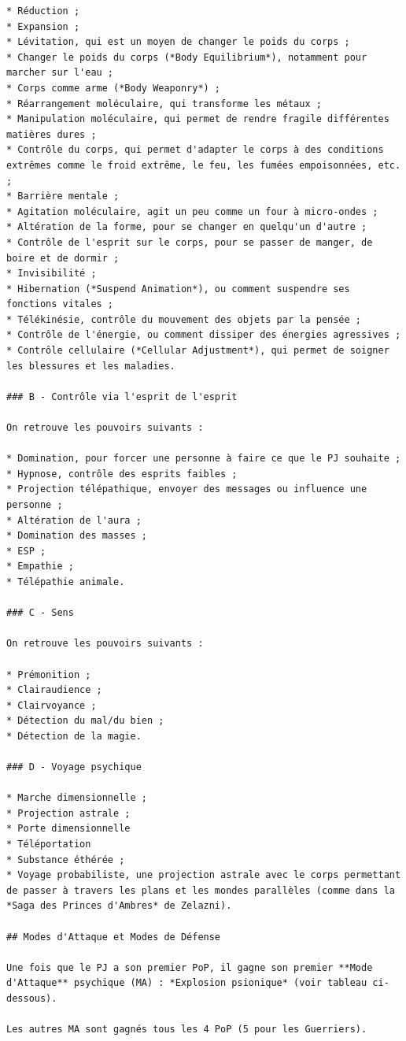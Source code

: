\documentclass[11pt]{article}
\begin{document}
{\begin{verbatim}
* Réduction ;
* Expansion ;
* Lévitation, qui est un moyen de changer le poids du corps ;
* Changer le poids du corps (*Body Equilibrium*), notamment pour marcher sur l'eau ;
* Corps comme arme (*Body Weaponry*) ;
* Réarrangement moléculaire, qui transforme les métaux ;
* Manipulation moléculaire, qui permet de rendre fragile différentes matières dures ;
* Contrôle du corps, qui permet d'adapter le corps à des conditions extrêmes comme le froid extrême, le feu, les fumées empoisonnées, etc. ;
* Barrière mentale ;
* Agitation moléculaire, agit un peu comme un four à micro-ondes ;
* Altération de la forme, pour se changer en quelqu'un d'autre ;
* Contrôle de l'esprit sur le corps, pour se passer de manger, de boire et de dormir ;
* Invisibilité ;
* Hibernation (*Suspend Animation*), ou comment suspendre ses fonctions vitales ;
* Télékinésie, contrôle du mouvement des objets par la pensée ;
* Contrôle de l'énergie, ou comment dissiper des énergies agressives ;
* Contrôle cellulaire (*Cellular Adjustment*), qui permet de soigner les blessures et les maladies.

### B - Contrôle via l'esprit de l'esprit

On retrouve les pouvoirs suivants :

* Domination, pour forcer une personne à faire ce que le PJ souhaite ;
* Hypnose, contrôle des esprits faibles ;
* Projection télépathique, envoyer des messages ou influence une personne ;
* Altération de l'aura ;
* Domination des masses ;
* ESP ;
* Empathie ;
* Télépathie animale.

### C - Sens

On retrouve les pouvoirs suivants :

* Prémonition ;
* Clairaudience ;
* Clairvoyance ;
* Détection du mal/du bien ;
* Détection de la magie.

### D - Voyage psychique

* Marche dimensionnelle ;
* Projection astrale ;
* Porte dimensionnelle
* Téléportation
* Substance éthérée ;
* Voyage probabiliste, une projection astrale avec le corps permettant de passer à travers les plans et les mondes parallèles (comme dans la *Saga des Princes d'Ambres* de Zelazni).

## Modes d'Attaque et Modes de Défense

Une fois que le PJ a son premier PoP, il gagne son premier **Mode d'Attaque** psychique (MA) : *Explosion psionique* (voir tableau ci-dessous).

Les autres MA sont gagnés tous les 4 PoP (5 pour les Guerriers).


\end{verbatim}}
\end{document}
